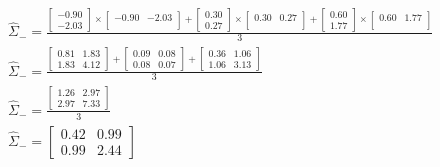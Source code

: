 \documentclass[leqno]{article}
\begin{document}
\begin{gather*}
\begin{split}
&\hat{\Sigma}_- = 
\frac{\begin{bmatrix}
   -0.90\\
   -2.03 
\end{bmatrix} \times \begin{bmatrix}
   -0.90 & -2.03\\
\end{bmatrix} + 
\begin{bmatrix}
   0.30\\
   0.27 
\end{bmatrix} \times \begin{bmatrix}
   0.30 & 0.27\\
\end{bmatrix} +
\begin{bmatrix}
   0.60\\
   1.77 
\end{bmatrix} \times \begin{bmatrix}
   0.60 & 1.77\\
\end{bmatrix}}{3}\\ 
&\hat{\Sigma}_- = 
\frac{\begin{bmatrix}
   0.81 & 1.83\\
   1.83 & 4.12 
\end{bmatrix} + 
\begin{bmatrix}
   0.09 & 0.08\\
   0.08 & 0.07 
\end{bmatrix} +
\begin{bmatrix}
   0.36 & 1.06\\
   1.06 & 3.13 
\end{bmatrix}
 }{3}\\
&\hat{\Sigma}_- = 
\frac{\begin{bmatrix}
   1.26 & 2.97\\
   2.97 & 7.33 
\end{bmatrix}}{3}\\
&\hat{\Sigma}_- = 
\begin{bmatrix}
   0.42 & 0.99\\
   0.99 & 2.44 
\end{bmatrix}\\
\end{split}
\end{gather*}

\hfill
\end{document}
